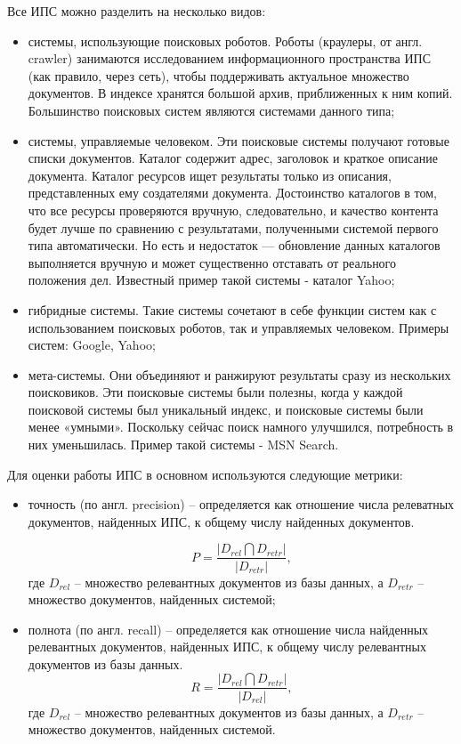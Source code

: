 Все ИПС можно разделить на несколько видов:
\begin{itemize}
\item системы, использующие поисковых роботов. Роботы (краулеры, от англ. crawler) занимаются исследованием информационного пространства ИПС (как правило, через сеть), чтобы поддерживать актуальное множество документов. В индексе хранятся большой архив, приближенных к ним копий. Большинство поисковых систем являются системами данного типа;
\item системы, управляемые человеком. Эти поисковые системы получают готовые списки документов. Каталог содержит адрес, заголовок и краткое описание документа. Каталог ресурсов ищет результаты только из описания, представленных ему создателями документа. Достоинство каталогов в том, что все ресурсы проверяются вручную, следовательно, и качество контента будет лучше по сравнению с результатами, полученными системой первого типа автоматически. Но есть и недостаток — обновление данных каталогов выполняется вручную и может существенно отставать от реального положения дел. Известный пример такой системы - каталог Yahoo;
\item гибридные системы. Такие системы сочетают в себе функции систем как с использованием поисковых роботов, так и управляемых человеком. Примеры систем: Google, Yahoo;
\item мета-системы. Они объединяют и ранжируют результаты сразу из нескольких поисковиков. Эти поисковые системы были полезны, когда у каждой поисковой системы был уникальный индекс, и поисковые системы были менее «умными». Поскольку сейчас поиск намного улучшился, потребность в них уменьшилась. Пример такой системы - MSN Search.
\end{itemize}

Для оценки работы ИПС в основном используются следующие метрики:
\begin{itemize}
\item точность (по англ. precision) -- определяется как отношение числа релеватных документов, найденных ИПС, к общему числу найденных документов.

\begin{equation}
P = \frac{| D_{rel} \bigcap D_{retr} |}{| D_{retr} |},
\end{equation} где $D_{rel}$ -- множество релевантных документов из базы данных, а $D_{retr}$ -- множество документов, найденных системой;
\item полнота (по англ. recall) -- определяется как отношение числа найденных релевантных документов, найденных ИПС, к общему числу релевантных документов из базы данных.
\begin{equation}
R = \frac{| D_{rel} \bigcap D_{retr} |}{| D_{rel} |},
\end{equation} где $D_{rel}$ -- множество релевантных документов из базы данных, а $D_{retr}$ -- множество документов, найденных системой. 
\end{itemize}

